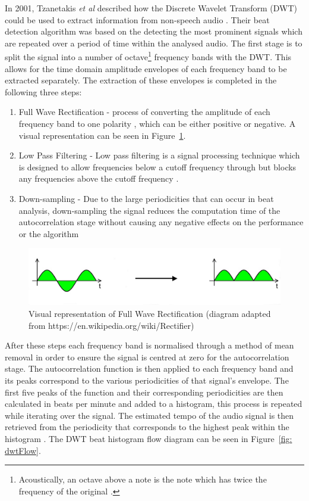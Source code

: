 \documentclass[a4paper, 11pt]{article}
\begin{document}
In 2001, Tzanetakis \textit{et al} described how the Discrete Wavelet Transform (DWT) could be used to extract information from non-speech audio \cite{tzane1}. Their beat detection algorithm was based on the detecting the most prominent signals which are repeated over a period of time within the analysed audio. The first stage is to split the signal into a number of octave\footnote{Acoustically, an octave above a note is the note which has twice the frequency of the original \cite{oxford-comp}.} frequency bands with the DWT. This allows for the time domain amplitude envelopes of each frequency band to be extracted separately. The extraction of these envelopes is completed in the following three steps:

\begin{enumerate}
\item Full Wave Rectification - process of converting the amplitude of each frequency band to one polarity \cite{pallas}, which can be either positive or negative. A visual representation can be seen in Figure~\ref{fig: fwr}.
\item Low Pass Filtering - Low pass filtering is a signal processing technique which is designed to allow frequencies below a cutoff frequency through but blocks any frequencies above the cutoff frequency \cite{smith}.
\item Down-sampling - Due to the large periodicities that can occur in beat analysis, down-sampling the signal reduces the computation time of the autocorrelation stage without causing any negative effects on the performance or the algorithm \cite{tzane3}
\end{enumerate}

\begin{figure}[ht]
	\centering
	\includegraphics[scale=0.25]{FWR2}
	\caption{Visual representation of Full Wave Rectification (diagram adapted from https://en.wikipedia.org/wiki/Rectifier)}
	\label{fig: fwr}
\end{figure}


After these steps each frequency band is normalised through a method of mean removal in order to ensure the signal is centred at zero for the autocorrelation stage. The autocorrelation function is then applied to each frequency band and its peaks correspond to the various periodicities of that signal's envelope. The first five peaks of the function and their corresponding periodicities are then calculated in beats per minute and added to a histogram, this process is repeated while iterating over the signal. The estimated tempo of the audio signal is then retrieved from the periodicity that corresponds to the highest peak within the histogram \cite{tzane1}. The DWT beat histogram flow diagram can be seen in Figure~\ref{fig: dwtFlow}.
\end{document}
